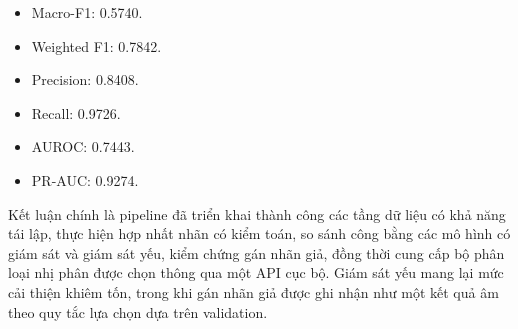 \begin{itemize}
    \item Macro-F1: 0.5740.
    \item Weighted F1: 0.7842.
    \item Precision: 0.8408.
    \item Recall: 0.9726.
    \item AUROC: 0.7443.
    \item PR-AUC: 0.9274.
\end{itemize}

Kết luận chính là pipeline đã triển khai thành công các tầng dữ liệu có khả năng tái lập, thực hiện hợp nhất nhãn có kiểm toán, so sánh công bằng các mô hình có giám sát và giám sát yếu, kiểm chứng gán nhãn giả, đồng thời cung cấp bộ phân loại nhị phân được chọn thông qua một API cục bộ. Giám sát yếu mang lại mức cải thiện khiêm tốn, trong khi gán nhãn giả được ghi nhận như một kết quả âm theo quy tắc lựa chọn dựa trên validation.
